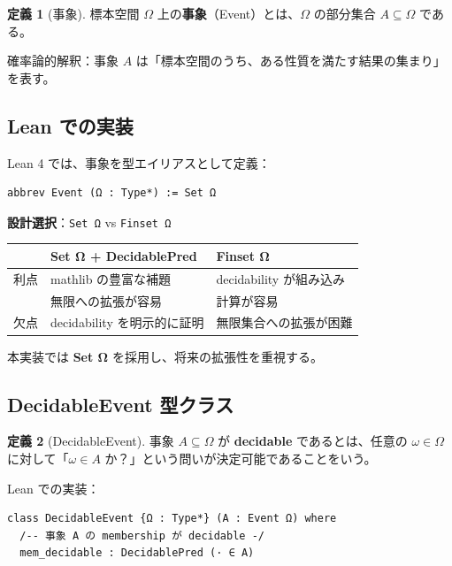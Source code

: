 \documentclass[12pt,a4paper,ja=standard]{bxjsarticle}
\theoremstyle{definition}
\newtheorem{definition}{定義}[section]
\begin{document}
\begin{definition}[事象]
標本空間 $\Omega$ 上の\textbf{事象}（Event）とは、$\Omega$ の部分集合 $A \subseteq \Omega$ である。

確率論的解釈：事象 $A$ は「標本空間のうち、ある性質を満たす結果の集まり」を表す。
\end{definition}

\subsection{Lean での実装}

Lean 4 では、事象を型エイリアスとして定義：

\begin{tcolorbox}[title=Lean コード（205 行目）]
\begin{verbatim}
abbrev Event (Ω : Type*) := Set Ω
\end{verbatim}
\end{tcolorbox}

\textbf{設計選択}：\texttt{Set Ω} vs \texttt{Finset Ω}

\begin{center}
\begin{tabular}{|l|p{5cm}|p{5cm}|}
\hline
& \textbf{Set Ω + DecidablePred} & \textbf{Finset Ω} \\
\hline
利点 & mathlib の豊富な補題 & decidability が組み込み \\
& 無限への拡張が容易 & 計算が容易 \\
\hline
欠点 & decidability を明示的に証明 & 無限集合への拡張が困難 \\
\hline
\end{tabular}
\end{center}

本実装では \textbf{Set Ω} を採用し、将来の拡張性を重視する。

\subsection{DecidableEvent 型クラス}

\begin{definition}[DecidableEvent]
事象 $A \subseteq \Omega$ が \textbf{decidable} であるとは、任意の $\omega \in \Omega$ に対して「$\omega \in A$ か？」という問いが決定可能であることをいう。
\end{definition}

Lean での実装：

\begin{tcolorbox}[title=Lean コード（223--225 行目）]
\begin{verbatim}
class DecidableEvent {Ω : Type*} (A : Event Ω) where
  /-- 事象 A の membership が decidable -/
  mem_decidable : DecidablePred (· ∈ A)
\end{verbatim}
\end{tcolorbox}
\end{document}
